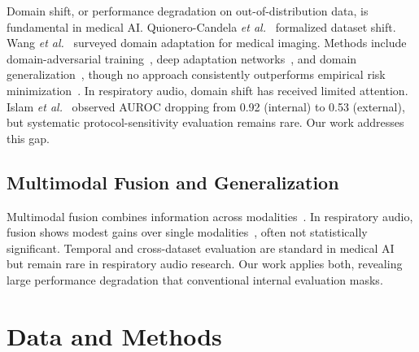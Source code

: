 \documentclass[conference]{IEEEtran}
\begin{document}
Domain shift, or performance degradation on out-of-distribution data, is fundamental in medical AI. Quionero-Candela \emph{et al.}~\cite{quionero2009} formalized dataset shift. Wang \emph{et al.}~\cite{wang2020domain} surveyed domain adaptation for medical imaging. Methods include domain-adversarial training~\cite{ganin2016}, deep adaptation networks~\cite{long2015}, and domain generalization~\cite{gulrajani2021}, though no approach consistently outperforms empirical risk minimization~\cite{gulrajani2021}. In respiratory audio, domain shift has received limited attention. Islam \emph{et al.}~\cite{islam2026} observed AUROC dropping from 0.92 (internal) to 0.53 (external), but systematic protocol-sensitivity evaluation remains rare. Our work addresses this gap.

\subsection{Multimodal Fusion and Generalization}

Multimodal fusion combines information across modalities~\cite{ngiam2011, baltrusaitis2018}. In respiratory audio, fusion shows modest gains over single modalities~\cite{chetupalli2023, truong2024}, often not statistically significant. Temporal and cross-dataset evaluation are standard in medical AI~\cite{collins2024tripod, steyerberg2010} but remain rare in respiratory audio research. Our work applies both, revealing large performance degradation that conventional internal evaluation masks.

\section{Data and Methods}
\label{sec:methods}
\end{document}
